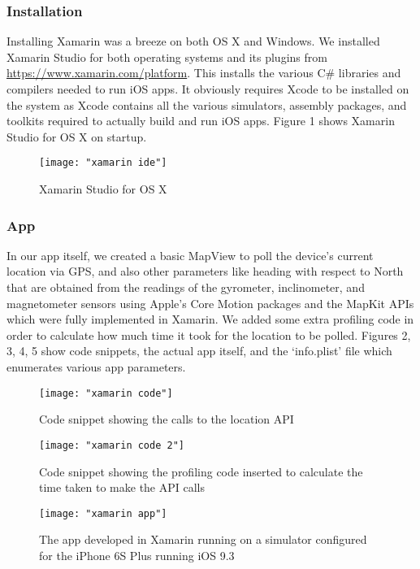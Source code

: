 \documentclass[12pt,a4paper]{article}
\begin{document}
	\subsubsection{Installation}
	
	Installing Xamarin was a breeze on both OS X and Windows. We installed Xamarin Studio for both operating systems and its plugins from \url{https://www.xamarin.com/platform}. This installs the various C\# libraries and compilers needed to run iOS apps. It obviously requires Xcode to be installed on the system as Xcode contains all the various simulators, assembly packages, and toolkits required to actually build and run iOS apps. Figure 1 shows Xamarin Studio for OS X on startup.
	
	\begin{figure}
	    \centering
	    \texttt{[image: "xamarin ide"]}
	    \caption{Xamarin Studio for OS X}
	\end{figure}
	
	\subsubsection{App}
	
	In our app itself, we created a basic MapView to poll the device's current location via GPS, and also other parameters like heading with respect to North that are obtained from the readings of the gyrometer, inclinometer, and magnetometer sensors using Apple's Core Motion packages and the MapKit APIs which were fully implemented in Xamarin. We added some extra profiling code in order to calculate how much time it took for the location to be polled. Figures 2, 3, 4, 5 show code snippets, the actual app itself, and the `info.plist' file which enumerates various app parameters.
	
	\begin{figure}
	    \centering
	    \texttt{[image: "xamarin code"]}
	    \caption{Code snippet showing the calls to the location API}
	\end{figure}
	
	\begin{figure}
	    \centering
	    \texttt{[image: "xamarin code 2"]}
	    \caption{Code snippet showing the profiling code inserted to calculate the time taken to make the API calls}
	\end{figure}
	
	\begin{figure}
	    \centering
	    \texttt{[image: "xamarin app"]}
	    \caption{The app developed in Xamarin running on a simulator configured for the iPhone 6S Plus running iOS 9.3}
	\end{figure}
	
\end{document}
